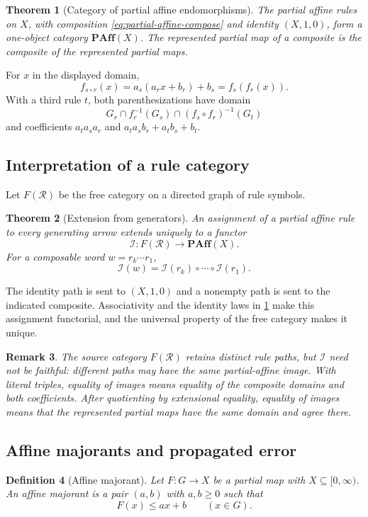 \documentclass[12pt,a4paper,twoside]{extarticle}
\makeatletter
\theoremstyle{compactplain}
\newtheorem{theorem}{Theorem}[section]
\theoremstyle{compactdef}
\newtheorem{definition}[theorem]{Definition}
\newtheorem{remark}[theorem]{Remark}
\renewenvironment{proof}[1][\proofname]{\par\pushQED{\qed}\normalfont
  \topsep2pt\trivlist\item[\hskip\labelsep\bfseries #1\@addpunct{.}]\ignorespaces}
 {\popQED\endtrivlist\@endpefalse}
\makeatother
\begin{document}
\begin{theorem}[Category of partial affine endomorphisms]\label{thm:partial-affine-category}
The partial affine rules on $X$, with composition \eqref{eq:partial-affine-compose} and identity $(X,1,0)$, form a one-object category $\mathbf{PAff}(X)$. The represented partial map of a composite is the composite of the represented partial maps.
\end{theorem}
\begin{proof}
For $x$ in the displayed domain,
\[
f_{s\circ r}(x)=a_s(a_rx+b_r)+b_s=f_s(f_r(x)).
\]
With a third rule $t$, both parenthesizations have domain
\[
G_r\cap f_r^{-1}(G_s)\cap(f_s\circ f_r)^{-1}(G_t)
\]
and coefficients $a_ta_sa_r$ and $a_ta_sb_r+a_tb_s+b_t$.
\end{proof}

\subsection{Interpretation of a rule category}
Let $F(\mathcal R)$ be the free category on a directed graph of rule symbols.

\begin{theorem}[Extension from generators]
An assignment of a partial affine rule to every generating arrow extends uniquely to a functor
\[
\mathcal I:F(\mathcal R)\to\mathbf{PAff}(X).
\]
For a composable word $w=r_k\cdots r_1$,
\[
\mathcal I(w)=\mathcal I(r_k)\circ\cdots\circ\mathcal I(r_1).
\]
\end{theorem}
\begin{proof}
The identity path is sent to $(X,1,0)$ and a nonempty path is sent to the indicated composite.  Associativity and the identity laws in \cref{thm:partial-affine-category} make this assignment functorial, and the universal property of the free category makes it unique.
\end{proof}

\begin{remark}
The source category $F(\mathcal R)$ retains distinct rule paths, but $\mathcal I$ need not be faithful: different paths may have the same partial-affine image.  With literal triples, equality of images means equality of the composite domains and both coefficients.  After quotienting by extensional equality, equality of images means that the represented partial maps have the same domain and agree there.
\end{remark}

\subsection{Affine majorants and propagated error}
\begin{definition}[Affine majorant]
Let $F:G\to X$ be a partial map with $X\subseteq[0,\infty)$. An affine majorant is a pair $(a,b)$ with $a,b\ge0$ such that
\[
F(x)\le ax+b\qquad(x\in G).
\]
\end{definition}
\end{document}
